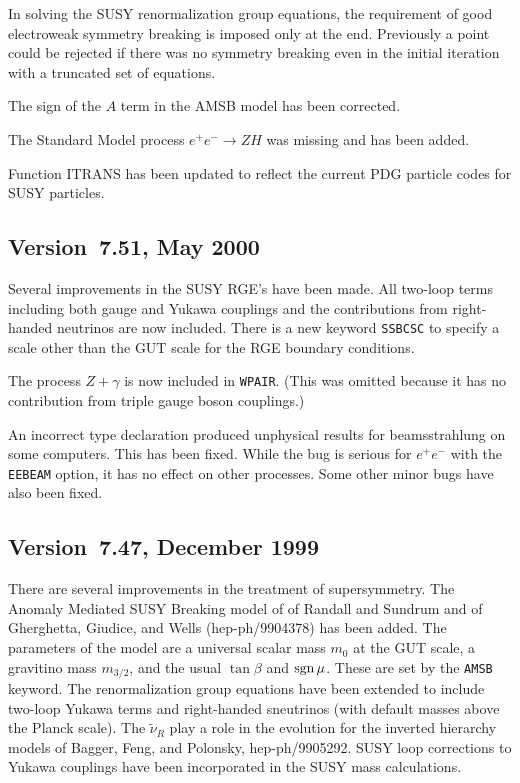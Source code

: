      In solving the SUSY renormalization group equations, the
requirement of good electroweak symmetry breaking is imposed only at the
end. Previously a point could be rejected if there was no symmetry
breaking even in the initial iteration with a truncated set of
equations.

     The sign of the $A$ term in the AMSB model has been corrected.

     The Standard Model process $e^+e^- \to ZH$ was missing and has been
added.

     Function ITRANS has been updated to reflect the current PDG
particle codes for SUSY particles.

\subsection{Version~7.51, May 2000}

        Several improvements in the SUSY RGE's have been made. All
two-loop terms including both gauge and Yukawa couplings and the
contributions from right-handed neutrinos are now included. There is a
new keyword \verb|SSBCSC| to specify a scale other than the GUT scale
for the RGE boundary conditions.

        The process $Z+\gamma$ is now included in \verb|WPAIR|. (This
was omitted because it has no contribution from triple gauge boson
couplings.)

        An incorrect type declaration produced unphysical results for
beamsstrahlung on some computers. This has been fixed. While the bug is
serious for $e^+e^-$ with the \verb|EEBEAM| option, it has no effect on
other processes. Some other minor bugs have also been fixed.

\subsection{Version~7.47, December 1999}

        There are several improvements in the treatment of
supersymmetry. The Anomaly Mediated SUSY Breaking model of of Randall
and Sundrum and of Gherghetta, Giudice, and Wells (hep-ph/9904378) has
been added. The parameters of the model are a universal scalar mass
$m_0$ at the GUT scale, a gravitino mass $m_{3/2}$, and the usual
$\tan\beta$ and $\mathop{\rm sgn}\mu$. These are set by the \verb|AMSB| keyword. The
renormalization group equations have been extended to include two-loop
Yukawa terms and right-handed sneutrinos (with default masses above the
Planck scale). The $\tilde\nu_R$ play a role in the evolution for the
inverted hierarchy models of Bagger, Feng, and Polonsky, hep-ph/9905292.
SUSY loop corrections to Yukawa couplings have been incorporated in the
SUSY mass calculations.

